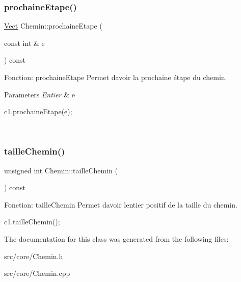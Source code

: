 \subsubsection{\texorpdfstring{prochaine\+Etape()}{prochaineEtape()}}
{\footnotesize\ttfamily \hyperlink{classVect}{Vect} Chemin\+::prochaine\+Etape (\begin{DoxyParamCaption}\item[{const int \&}]{e }\end{DoxyParamCaption}) const}



Fonction\+: prochaine\+Etape Permet d\textquotesingle{}avoir la prochaine étape du chemin. 


\begin{DoxyParams}{Parameters}
{\em Entier} & e 
\begin{DoxyCode}
c1.prochaineEtape(e);
\end{DoxyCode}
 \\
\hline
\end{DoxyParams}
\mbox{\label{classChemin_ad02f568d7966d0ce0184fb008ecf20bc}} 
\subsubsection{\texorpdfstring{taille\+Chemin()}{tailleChemin()}}
{\footnotesize\ttfamily unsigned int Chemin\+::taille\+Chemin (\begin{DoxyParamCaption}{ }\end{DoxyParamCaption}) const}



Fonction\+: taille\+Chemin Permet d\textquotesingle{}avoir l\textquotesingle{}entier positif de la taille du chemin. 


\begin{DoxyCode}
c1.tailleChemin();
\end{DoxyCode}
 

The documentation for this class was generated from the following files\+:\begin{DoxyCompactItemize}
\item 
src/core/Chemin.\+h\item 
src/core/Chemin.\+cpp\end{DoxyCompactItemize}
